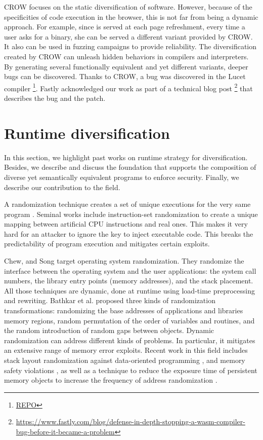 CROW focuses on the static diversification of software. However, because of the specificities of code execution in the browser, this is not far from being a dynamic approach. For example, since \wasm is served at each page refreshment, every time a user asks for a \wasm binary, she can be served a different variant provided by CROW.
It also can be used in fuzzing campaigns \citationneeded to provide reliability. The diversification created by CROW can unleash hidden behaviors in compilers and interpreters.
By generating several functionally equivalent and yet different variants, deeper bugs can be discovered. 
Thanks to CROW, a bug was discovered in the Lucet compiler \footnote{\url{REPO}}.
Fastly acknowledged our work as part of a technical blog post 
\footnote{\url{https://www.fastly.com/blog/defense-in-depth-stopping-a-wasm-compiler-bug-before-it-became-a-problem}} that describes the bug and the patch. 

\section{Runtime diversification}
\label{sota:randomization}

In this section, we highlight past works on runtime strategy for diversification. Besides, we describe and discuss the foundation that supports the composition of diverse yet semantically equivalent programs to enforce security. Finally, we describe our contribution to the field.


A randomization technique creates a set of unique executions for the very same program \cite{bhatkar03}. Seminal works include instruction-set randomization \cite{Kc03,barrantes2003randomized}
to create a unique mapping between artificial CPU instructions and real ones. This makes it very hard for an attacker to ignore the key to inject executable code. This breaks the predictability of program execution and mitigates certain exploits.


Chew, and Song \cite{Chew02mitigatingbuffer} target operating system randomization. They randomize the interface between the operating system and the user applications:
the system call numbers, the library entry points (memory addresses), and the stack placement. All those techniques are dynamic, done at runtime using load-time preprocessing and rewriting. 
Bathkar et al. \cite{bhatkar03,bhatkar2005efficient} proposed three kinds of randomization transformations: randomizing the base addresses of applications and libraries  memory regions, random permutation of the order of variables and routines, and the random introduction of random gaps between objects. 
Dynamic randomization can address different kinds of problems. In particular, it mitigates an extensive range of memory error exploits. 
Recent work in this field includes stack layout randomization against data-oriented programming \cite{aga2019smokestack}, and memory safety violations \cite{lee2021savior}, as well as a technique to reduce the exposure time of persistent memory objects to increase the frequency of address randomization \cite{xu2020merr}.






